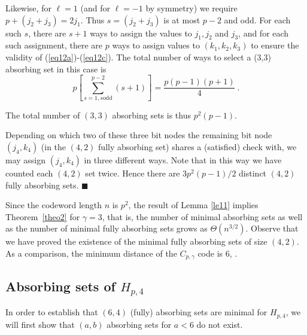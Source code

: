 Likewise, for $\ell=1$ (and for $\ell=-1$ by symmetry) we require
$p+(j_2+j_3)=2j_1$. Thus $s=(j_2+j_3)$ is at most $p-2$ and odd.
For each such $s$, there are $s+1$ ways to assign the values to
$j_1,j_2$ and $j_3$, and for each such assignment, there are $p$
ways to assign values to $(k_1,k_2,k_3)$ to ensure the validity of
(\ref{eq12a})-(\ref{eq12c}). The total number of ways to select a
(3,3) absorbing set in this case is
\[
p\left[\sum_{s=1, s \text{
odd}}^{p-2}(s+1)\right]=\frac{p(p-1)(p+1)}{4}~.
\]

The total number of $(3,3)$ absorbing sets is thus $p^2(p-1)$.

Depending on which two of these three bit nodes the remaining bit
node $(j_4,k_4)$ (in the $(4,2)$ fully absorbing set) shares a
(satisfied) check with, we may assign $(j_4,k_4)$ in three
different ways. Note that in this way we have counted each $(4,2)$
set twice. Hence there are $3p^2(p-1)/2$ distinct $(4,2)$ fully
absorbing sets. \hfill$\blacksquare$


Since the codeword length $n$ is $p^2$, the result of Lemma
\ref{le11} implies Theorem~\ref{theo2} for $\gamma=3$, that is,
the number of minimal absorbing sets as well as the number of
minimal fully absorbing sets grows as $\Theta(n^{3/2})$. Observe
that we have proved  the existence of the minimal fully absorbing
sets of size $(4,2)$. As a comparison, the minimum distance of the
$C_{p,\gamma}$ code is $6$, \cite{helles}.

\subsection{Absorbing sets of $H_{p,4}$}\label{theo14}



In order to establish that $(6,4)$ (fully) absorbing sets are
minimal for $H_{p,4}$, we will first show that $(a,b)$ absorbing
sets for $a < 6$ do not exist.



